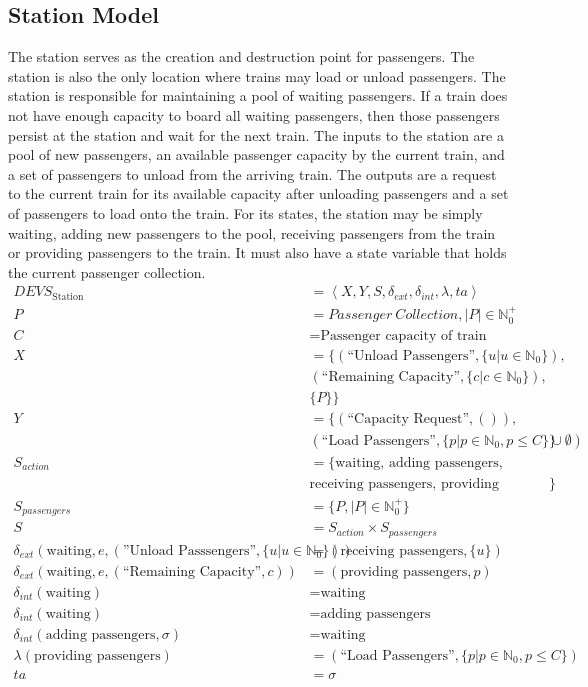 \subsection{Station Model}
The station serves as the creation and destruction point for passengers.  The station is also the only location where trains may load or unload passengers. The station is responsible for maintaining a pool of waiting passengers.  If a train does not have enough capacity to board all waiting passengers, then those passengers persist at the station and wait for the next train.  The inputs to the station are a pool of new passengers, an available passenger capacity by the current train, and a set of passengers to unload from the arriving train.  The outputs are a request to the current train for its available capacity after unloading passengers and a set of passengers to load onto the train. For its states, the station may be simply waiting, adding new passengers to the pool, receiving passengers from the train or providing passengers to the train.  It must also have a state variable that holds the current passenger collection.
\begin{align*}
DEVS_{\textrm{Station}} &= \left<X,Y,S,\delta_{ext},\delta_{int},\lambda,ta\right> \\
P &= Passenger\ Collection, |P|\in\mathbb{N}_0^+ \\
C &= \text{Passenger capacity of train} \\
X &= \lbrace(\text{``Unload Passengers''},\lbrace u|u\in\mathbb{N}_0\rbrace), \\ & (\text{``Remaining Capacity''},\lbrace c|c\in\mathbb{N}_0\rbrace), \\ &\lbrace P\rbrace\rbrace \\
Y &= \lbrace(\text{``Capacity Request''},()), \\ & (\text{``Load Passengers''},\lbrace p|p\in\mathbb{N}_0,p\leq C\rbrace\cup \emptyset)\rbrace \\
S_{action} &= \lbrace\text{waiting, adding passengers}, \\ & \text{receiving passengers, providing passengers}\rbrace \\
S_{passengers} &= \lbrace P, |P|\in\mathbb{N}_0^+\rbrace \\
S &= S_{action}\times S_{passengers} \\
\delta_{ext}(\text{waiting},e,(\text{''Unload Passsengers''},\lbrace u|u\in\mathbb{N}_0\rbrace)) &= (\text{receiving passengers},\lbrace u\rbrace) \\
\delta_{ext}(\text{waiting},e,(\text{``Remaining Capacity''},c)) &= (\text{providing passengers},p) \\
\delta_{int}(\text{waiting}) &= \text{waiting} \\
\delta_{int}(\text{waiting}) &= \text{adding passengers} \\
\delta_{int}(\text{adding passengers},\sigma) &= \text{waiting} \\
\lambda(\text{providing passengers}) &= (\text{``Load Passengers''},\lbrace p|p\in\mathbb{N}_0,p\leq C\rbrace) \\
ta &= \sigma \\
\end{align*}
%
